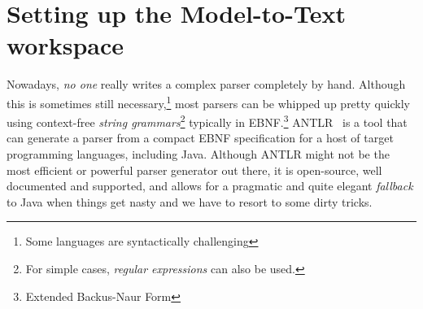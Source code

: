 \newpage
\section{Setting up the Model-to-Text workspace}
\genHeader

Nowadays, \emph{no one} really writes a complex parser completely by hand. Although this is sometimes still necessary,\footnote{Some languages are syntactically
challenging} most parsers can be whipped up pretty quickly using context-free \emph{string grammars}\footnote{For simple cases, \emph{regular
expressions} can also be used.} typically in EBNF.\footnote{Extended Backus-Naur Form}
ANTLR~\cite{ANTLR} is a tool that can generate a parser from a compact EBNF specification for a host of target programming languages, including Java.
Although ANTLR might not be the most efficient or powerful parser generator out there, it is open-source, well documented and supported, and allows for a
pragmatic and quite elegant \emph{fallback} to Java when things get nasty and we have to resort to some dirty tricks.



